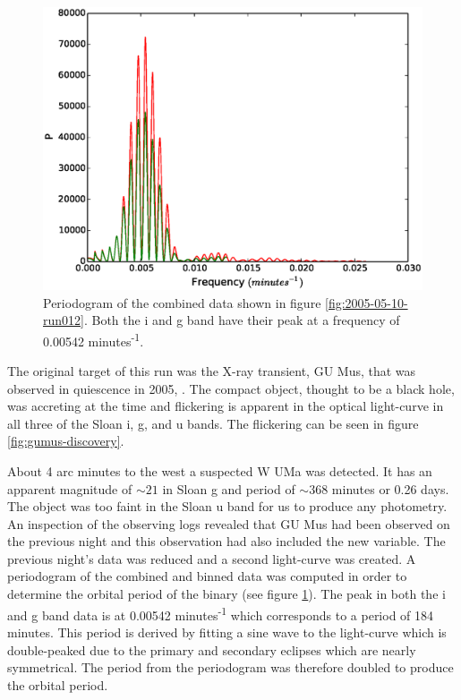  \begin{figure}
     \center
     \includegraphics[width=120mm]{images/2005-05-10-pgram-bin16.eps} 
     \caption{Periodogram of the combined data shown in figure \ref{fig:2005-05-10-run012}. Both the i and g band have their peak at a frequency of 0.00542 minutes\textsuperscript{-1}.}
     \label{fig:2005-05-10-pgram}
   \end{figure}

  
The original target of this run was the X-ray transient, {GU Mus}, that was observed in quiescence in 2005, \citep{tariq2010}. The compact object, thought to be a black hole, was accreting at the time and flickering is apparent in the optical light-curve in all three of the Sloan i, g, and u bands. The flickering can be seen in figure \ref{fig:gumus-discovery}. 

About 4 arc minutes to the west a suspected {W UMa} was detected. It has an apparent magnitude of $\sim21$ in Sloan g and period of $\sim 368$ minutes or 0.26 days. The object was too faint in the Sloan u band for us to produce any photometry. An inspection of the observing logs revealed that GU Mus had been observed on the previous night and this observation had also included the new variable. The previous night's data was reduced and a second light-curve was created. A periodogram of the combined and binned data  was computed in order to determine the orbital period of the binary (see figure \ref{fig:2005-05-10-pgram}). The peak in both the i and g band data is at 0.00542 minutes\textsuperscript{-1} which corresponds to a period of 184 minutes. This period is derived by fitting a sine wave to the light-curve which is double-peaked due to the primary and secondary eclipses which are nearly symmetrical. The period from the periodogram was therefore doubled to produce the orbital period. 

